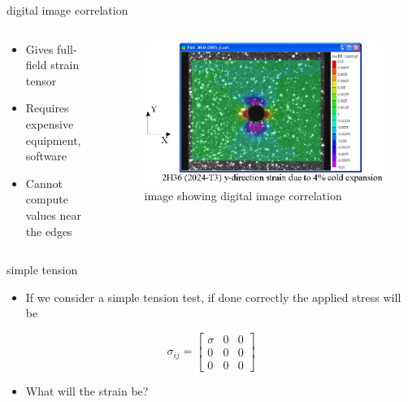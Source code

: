 \documentclass[
  letterpaper,
  ignorenonframetext,
  aspectratio=43,
  handout,
  12pt]{beamer}
\providecommand{\tightlist}{%
  \setlength{\itemsep}{0pt}\setlength{\parskip}{0pt}}
\providecommand{\tightlist}{%
\setlength{\itemsep}{0pt}\setlength{\parskip}{0pt}}
\let\Oldincludegraphics\includegraphics
\renewcommand{\includegraphics}[2][]{\Oldincludegraphics[width=\textwidth,height=0.7\textheight,keepaspectratio]{#2}}
\begin{document}
\begin{frame}{digital image correlation}
\protect\hypertarget{digital-image-correlation}{}
\begin{columns}[T]
\begin{column}{0.5\textwidth}
\begin{itemize}
\tightlist
\item
  Gives full-field strain tensor
\item
  Requires expensive equipment, software
\item
  Cannot compute values near the edges
\end{itemize}
\end{column}

\begin{column}{0.5\textwidth}
\begin{figure}
\centering
\includegraphics{../images/dic.jpg}
\caption{image showing digital image correlation}
\end{figure}
\end{column}
\end{columns}
\end{frame}

\begin{frame}{simple tension}
\protect\hypertarget{simple-tension-1}{}
\begin{itemize}
\tightlist
\item
  If we consider a simple tension test, if done correctly the applied
  stress will be
\end{itemize}

\[\sigma_{ij} = \begin{bmatrix}
    \sigma & 0 & 0 \\
    0 & 0 & 0\\
    0 & 0 & 0
\end{bmatrix}\]

\begin{itemize}
\tightlist
\item
  What will the strain be?
\end{itemize}
\end{frame}
\end{document}
